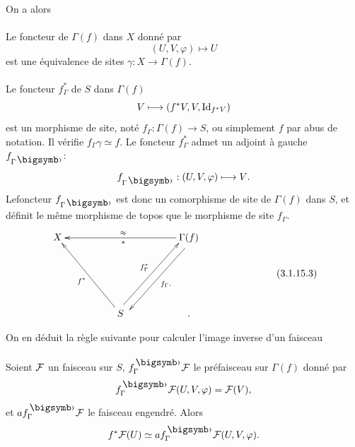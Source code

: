 \documentclass[10pt]{../fichiers-configuration-latex/smfart}
\begin{document}
On a alors

\paragraph{}
Le foncteur de $\Gamma(f)$ dans $X$ donné par
$$
(U,V,\varphi)\longmapsto U
$$
est une équivalence de sites $\gamma:X\rightarrow \Gamma(f)$.

\paragraph{}
Le foncteur $f^{\ast}_{\Gamma}$ de $S$ dans $\Gamma(f)$
$$
V\longmapsto (f^{\ast}V,V,\operatorname{Id}_{f^{\ast}V})
$$
est un morphisme de site, noté $f_{\Gamma}:\Gamma(f)\rightarrow S$, ou
simplement $f$ par abus de notation. Il vérifie
$f_{\Gamma}\gamma\simeq f$. Le foncteur $f^{\ast}_{\Gamma}$ admet un
adjoint à gauche $f_{\Gamma\bigdot}$:
$$
f_{\Gamma\bigdot}:(U,V,\varphi)\longmapsto V{\quoi}.
$$
Le\pageoriginale foncteur $f_{\Gamma\bigdot}$ est donc un comorphisme
de site de $\Gamma(f)$ dans $S$,
et définit le même morphisme de topos
que le morphisme de site $f_{\Gamma}$.
\begin{equation*}
\vcenter{
\xymatrix@R=2.2cm@C=1.75cm{
X &         &\Gamma(f) \ar[ll]^{\ast}_{\approx}
\ar@<4pt>[ld]^{f_{\Gamma}.}& \\
  &    S \ar[lu]^{f^{\ast}}  \ar@<4pt>[ru]^{f^{\ast}_{\Gamma}} & .
}}\tag{3.1.15.3}
\end{equation*}

On en déduit la règle suivante pour calculer l'image inverse d'un
faisceau

\setcounter{paragraph}{3}
\paragraph{}
Soient ${\mathcal F}$ un faisceau sur $S$,
$f^{\bigdot}_{\Gamma}\Ff$ le préfaisceau sur $\Gamma(f)$ donné
par
$$
f^{\bigdot}_{\Gamma}\Ff(U,V,\varphi)=\Ff(V){\quoi},
$$
et $af^{\bigdot}_{\Gamma}\Ff$ le faisceau engendré. Alors
$$
f^{\ast}\Ff(U)\simeq
af^{\bigdot}_{\Gamma}\Ff(U,V,\varphi){\quoi}.
$$
\end{document}
